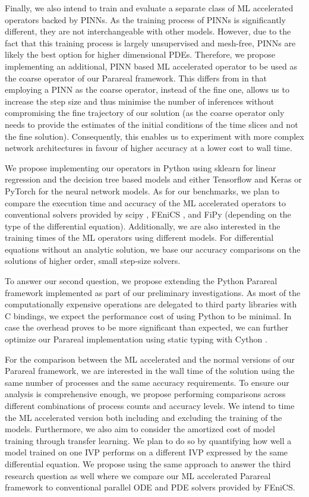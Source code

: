 \documentclass{article}
\begin{document}
Finally, we also intend to train and evaluate a separate class of ML accelerated operators backed by PINNs. As the training process of PINNs is significantly different, they are not interchangeable with other models. However, due to the fact that this training process is largely unsupervised and mesh-free, PINNs are likely the best option for higher dimensional PDEs. Therefore, we propose implementing an additional, PINN based ML accelerated operator to be used as the coarse operator of our Parareal framework. This differs from \cite{meng2019} in that employing a PINN as the coarse operator, instead of the fine one, allows us to increase the step size and thus minimise the number of inferences without compromising the fine trajectory of our solution (as the coarse operator only needs to provide the estimates of the initial conditions of the time slices and not the fine solution). Consequently, this enables us to experiment with more complex network architectures in favour of higher accuracy at a lower cost to wall time.

We propose implementing our operators in Python using sklearn \cite{pedregosa2011} for linear regression and the decision tree based models and either Tensorflow \cite{mart2015} and Keras \cite{chollet2015} or PyTorch \cite{paszke2019} for the neural network models. As for our benchmarks, we plan to compare the execution time and accuracy of the ML accelerated operators to conventional solvers provided by scipy \cite{scipy2020}, FEniCS \cite{fenics2015}, and FiPy \cite{fipy2009} (depending on the type of the differential equation). Additionally, we are also interested in the training times of the ML operators using different models. For differential equations without an analytic solution, we base our accuracy comparisons on the solutions of higher order, small step-size solvers.

To answer our second question, we propose extending the Python Parareal framework implemented as part of our preliminary investigations. As most of the computationally expensive operations are delegated to third party libraries with C bindings, we expect the performance cost of using Python to be minimal. In case the overhead proves to be more significant than expected, we can further optimize our Parareal implementation using static typing with Cython \cite{behnel2010}.

For the comparison between the ML accelerated and the normal versions of our Parareal framework, we are interested in the wall time of the solution using the same number of processes and the same accuracy requirements. To ensure our analysis is comprehensive enough, we propose performing comparisons across different combinations of process counts and accuracy levels. We intend to time the ML accelerated version both including and excluding the training of the models. Furthermore, we also aim to consider the amortized cost of model training through transfer learning. We plan to do so by quantifying how well a model trained on one IVP performs on a different IVP expressed by the same differential equation. We propose using the same approach to answer the third research question as well where we compare our ML accelerated Parareal framework to conventional parallel ODE and PDE solvers provided by FEniCS.
\end{document}

